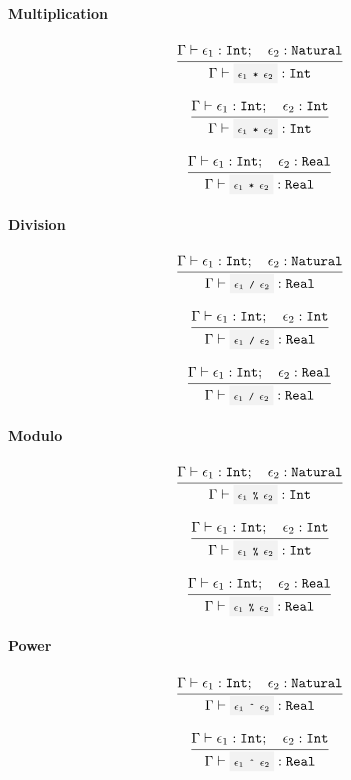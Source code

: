 \paragraph{Multiplication}

\[
	\infrule{
		\EnvSym\then \expr_1:\Int \semiq \expr_2:\Natural
	}{
		\EnvSym\then \code{$\expr_1$ * $\expr_2$} : \Int
	}
\]

\[
	\infrule{
		\EnvSym\then \expr_1:\Int \semiq \expr_2:\Int
	}{
		\EnvSym\then \code{$\expr_1$ * $\expr_2$} : \Int
	}
\]

\[
	\infrule{
		\EnvSym\then \expr_1:\Int \semiq \expr_2:\Real
	}{
		\EnvSym\then \code{$\expr_1$ * $\expr_2$} : \Real
	}
\]

\paragraph{Division}

\[
	\infrule{
		\EnvSym\then \expr_1:\Int \semiq \expr_2:\Natural
	}{
		\EnvSym\then \code{$\expr_1$ / $\expr_2$} : \Real
	}
\]

\[
	\infrule{
		\EnvSym\then \expr_1:\Int \semiq \expr_2:\Int
	}{
		\EnvSym\then \code{$\expr_1$ / $\expr_2$} : \Real
	}
\]

\[
	\infrule{
		\EnvSym\then \expr_1:\Int \semiq \expr_2:\Real
	}{
		\EnvSym\then \code{$\expr_1$ / $\expr_2$} : \Real
	}
\]

\paragraph{Modulo}

\[
	\infrule{
		\EnvSym\then \expr_1:\Int \semiq \expr_2:\Natural
	}{
		\EnvSym\then \code{$\expr_1$ \% $\expr_2$} : \Int
	}
\]

\[
	\infrule{
		\EnvSym\then \expr_1:\Int \semiq \expr_2:\Int
	}{
		\EnvSym\then \code{$\expr_1$ \% $\expr_2$} : \Int
	}
\]

\[
	\infrule{
		\EnvSym\then \expr_1:\Int \semiq \expr_2:\Real
	}{
		\EnvSym\then \code{$\expr_1$ \% $\expr_2$} : \Real
	}
\]

\paragraph{Power}

\[
	\infrule{
		\EnvSym\then \expr_1:\Int \semiq \expr_2:\Natural
	}{
		\EnvSym\then \code{$\expr_1$ \^{} $\expr_2$} : \Real
	}
\]

\[
	\infrule{
		\EnvSym\then \expr_1:\Int \semiq \expr_2:\Int
	}{
		\EnvSym\then \code{$\expr_1$ \^{} $\expr_2$} : \Real
	}
\]


